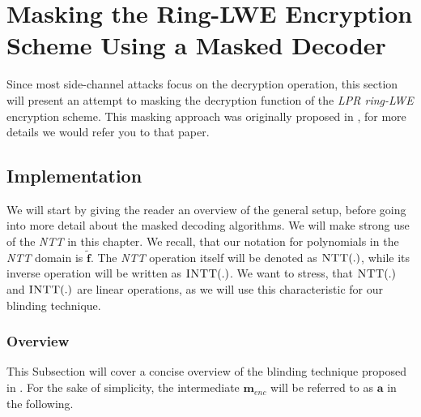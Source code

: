 %
%

\chapter{Masking the Ring-LWE Encryption Scheme Using a Masked Decoder}
Since most side-channel attacks focus on the decryption operation, this section will present an attempt to masking the decryption function of the \textit{\ac{LPR} \ac{ring-LWE}} encryption scheme. This masking approach was originally proposed in \cite{maskedRing}, for more details we would refer you to that paper.

\section{Implementation}
We will start by giving the reader an overview of the general setup, before going into more detail about the masked decoding algorithms. We will make strong use of the \textit{\ac{NTT}} in this chapter. We recall, that our notation for polynomials in the \textit{\ac{NTT}} domain is \(\tilde{\textbf{f}}\). The \textit{\ac{NTT}} operation itself will be denoted as \(\textsc{NTT}(.)\), while its inverse operation will be written as \(\textsc{INTT}(.)\). We want to stress, that \(\textsc{NTT}(.)\) and \(\textsc{INTT}(.)\) are linear operations, as we will use this characteristic for our blinding technique.

\subsection{Overview}
This Subsection will cover a concise overview of the blinding technique proposed in \cite{maskedRing}. For the sake of simplicity, the intermediate \(\textbf{m}_{enc}\) will be referred to as \(\textbf{a}\) in the following.

